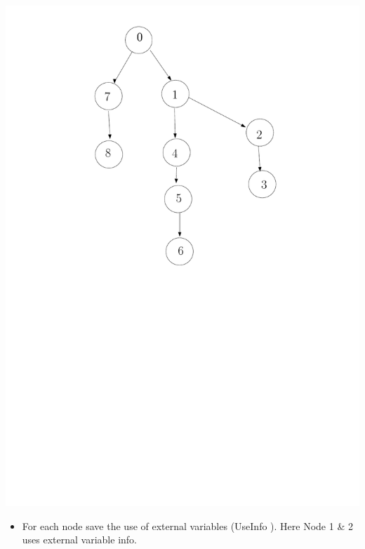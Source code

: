 \documentclass[12pt]{beamer}
\begin{document}
\begin{frame}[plain]
  \includegraphics[scale=0.3]{start1.pdf}
  \begin{itemize}
  \item For each node save the use of external variables (UseInfo ). Here Node 1 \& 2
    uses external variable info.
  \end{itemize}
\end{frame}
\end{document}
